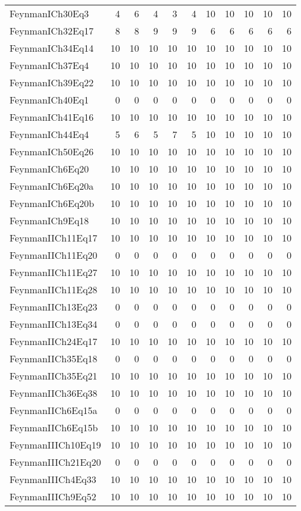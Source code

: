 \begin{tabular}{lrrrrrrrrrr}
FeynmanICh30Eq3 & 4 & 6 & 4 & 3 & 4 & 10 & 10 & 10 & 10 & 10 \\
FeynmanICh32Eq17 & 8 & 8 & 9 & 9 & 9 & 6 & 6 & 6 & 6 & 6 \\
FeynmanICh34Eq14 & 10 & 10 & 10 & 10 & 10 & 10 & 10 & 10 & 10 & 10 \\
FeynmanICh37Eq4 & 10 & 10 & 10 & 10 & 10 & 10 & 10 & 10 & 10 & 10 \\
FeynmanICh39Eq22 & 10 & 10 & 10 & 10 & 10 & 10 & 10 & 10 & 10 & 10 \\
FeynmanICh40Eq1 & 0 & 0 & 0 & 0 & 0 & 0 & 0 & 0 & 0 & 0 \\
FeynmanICh41Eq16 & 10 & 10 & 10 & 10 & 10 & 10 & 10 & 10 & 10 & 10 \\
FeynmanICh44Eq4 & 5 & 6 & 5 & 7 & 5 & 10 & 10 & 10 & 10 & 10 \\
FeynmanICh50Eq26 & 10 & 10 & 10 & 10 & 10 & 10 & 10 & 10 & 10 & 10 \\
FeynmanICh6Eq20 & 10 & 10 & 10 & 10 & 10 & 10 & 10 & 10 & 10 & 10 \\
FeynmanICh6Eq20a & 10 & 10 & 10 & 10 & 10 & 10 & 10 & 10 & 10 & 10 \\
FeynmanICh6Eq20b & 10 & 10 & 10 & 10 & 10 & 10 & 10 & 10 & 10 & 10 \\
FeynmanICh9Eq18 & 10 & 10 & 10 & 10 & 10 & 10 & 10 & 10 & 10 & 10 \\
FeynmanIICh11Eq17 & 10 & 10 & 10 & 10 & 10 & 10 & 10 & 10 & 10 & 10 \\
FeynmanIICh11Eq20 & 0 & 0 & 0 & 0 & 0 & 0 & 0 & 0 & 0 & 0 \\
FeynmanIICh11Eq27 & 10 & 10 & 10 & 10 & 10 & 10 & 10 & 10 & 10 & 10 \\
FeynmanIICh11Eq28 & 10 & 10 & 10 & 10 & 10 & 10 & 10 & 10 & 10 & 10 \\
FeynmanIICh13Eq23 & 0 & 0 & 0 & 0 & 0 & 0 & 0 & 0 & 0 & 0 \\
FeynmanIICh13Eq34 & 0 & 0 & 0 & 0 & 0 & 0 & 0 & 0 & 0 & 0 \\
FeynmanIICh24Eq17 & 10 & 10 & 10 & 10 & 10 & 10 & 10 & 10 & 10 & 10 \\
FeynmanIICh35Eq18 & 0 & 0 & 0 & 0 & 0 & 0 & 0 & 0 & 0 & 0 \\
FeynmanIICh35Eq21 & 10 & 10 & 10 & 10 & 10 & 10 & 10 & 10 & 10 & 10 \\
FeynmanIICh36Eq38 & 10 & 10 & 10 & 10 & 10 & 10 & 10 & 10 & 10 & 10 \\
FeynmanIICh6Eq15a & 0 & 0 & 0 & 0 & 0 & 0 & 0 & 0 & 0 & 0 \\
FeynmanIICh6Eq15b & 10 & 10 & 10 & 10 & 10 & 10 & 10 & 10 & 10 & 10 \\
FeynmanIIICh10Eq19 & 10 & 10 & 10 & 10 & 10 & 10 & 10 & 10 & 10 & 10 \\
FeynmanIIICh21Eq20 & 0 & 0 & 0 & 0 & 0 & 0 & 0 & 0 & 0 & 0 \\
FeynmanIIICh4Eq33 & 10 & 10 & 10 & 10 & 10 & 10 & 10 & 10 & 10 & 10 \\
FeynmanIIICh9Eq52 & 10 & 10 & 10 & 10 & 10 & 10 & 10 & 10 & 10 & 10 \\
\bottomrule
\end{tabular}
